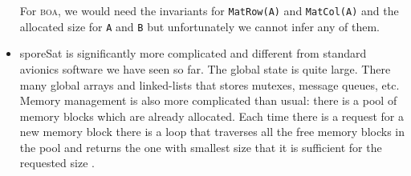 \documentclass[a4]{article}
\begin{document}
\begin{itemize}
\noindent For \textsc{boa}, we would need the invariants for
\texttt{MatRow(A)} and \texttt{MatCol(A)} and the allocated size for
\texttt{A} and \texttt{B} but unfortunately we cannot infer any of
them.

\item \textsf{sporeSat} is significantly more complicated and
  different from standard avionics software we have seen so far. 
%
The global state is quite large. There many global arrays and
linked-lists that stores mutexes, message queues, etc. Memory
management is also more complicated than usual: there is a pool of
memory blocks which are already allocated. Each time there is a
request for a new memory block there is a loop that traverses all the
free memory blocks in the pool and returns the one with smallest size
that it is sufficient for the requested size .

\end{itemize}
\end{document}
